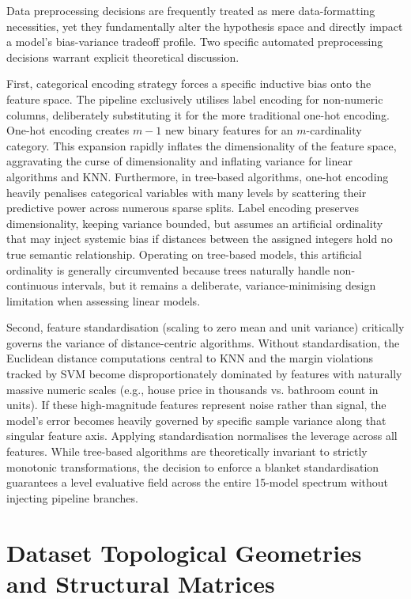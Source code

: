 \documentclass[conference]{IEEEtran}
\begin{document}
Data preprocessing decisions are frequently treated as mere data-formatting necessities, yet they fundamentally alter the hypothesis space and directly impact a model's bias-variance tradeoff profile. Two specific automated preprocessing decisions warrant explicit theoretical discussion.

First, categorical encoding strategy forces a specific inductive bias onto the feature space. The pipeline exclusively utilises label encoding for non-numeric columns, deliberately substituting it for the more traditional one-hot encoding. One-hot encoding creates $m-1$ new binary features for an $m$-cardinality category. This expansion rapidly inflates the dimensionality of the feature space, aggravating the curse of dimensionality and inflating variance for linear algorithms and KNN. Furthermore, in tree-based algorithms, one-hot encoding heavily penalises categorical variables with many levels by scattering their predictive power across numerous sparse splits. Label encoding preserves dimensionality, keeping variance bounded, but assumes an artificial ordinality that may inject systemic bias if distances between the assigned integers hold no true semantic relationship. Operating on tree-based models, this artificial ordinality is generally circumvented because trees naturally handle non-continuous intervals, but it remains a deliberate, variance-minimising design limitation when assessing linear models.

Second, feature standardisation (scaling to zero mean and unit variance) critically governs the variance of distance-centric algorithms. Without standardisation, the Euclidean distance computations central to KNN and the margin violations tracked by SVM become disproportionately dominated by features with naturally massive numeric scales (e.g., house price in thousands vs. bathroom count in units). If these high-magnitude features represent noise rather than signal, the model's error becomes heavily governed by specific sample variance along that singular feature axis. Applying standardisation normalises the leverage across all features. While tree-based algorithms are theoretically invariant to strictly monotonic transformations, the decision to enforce a blanket standardisation guarantees a level evaluative field across the entire 15-model spectrum without injecting pipeline branches.

\section{Dataset Topological Geometries and Structural Matrices}
\end{document}
